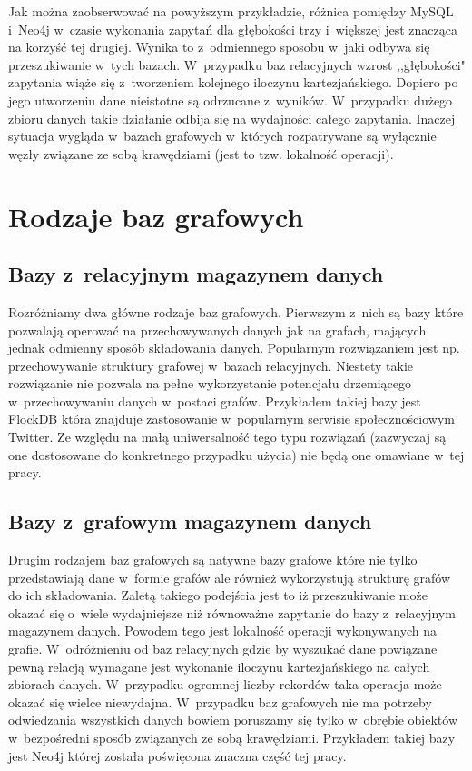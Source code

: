 \documentclass{xmgr}
\begin{document}
Jak można zaobserwować na powyższym przykładzie, różnica pomiędzy MySQL i~Neo4j w~czasie wykonania zapytań dla głębokości trzy i~większej jest znacząca na korzyść tej drugiej. Wynika to z~odmiennego sposobu w~jaki odbywa się przeszukiwanie w~tych bazach. W~przypadku baz relacyjnych wzrost ,,głębokości" zapytania wiąże się z~tworzeniem kolejnego iloczynu kartezjańskiego. Dopiero po jego utworzeniu dane nieistotne są odrzucane z~wyników. W~przypadku dużego zbioru danych takie działanie odbija się na wydajności całego zapytania. Inaczej sytuacja wygląda w~bazach grafowych w~których rozpatrywane są wyłącznie węzły związane ze sobą krawędziami (jest to tzw. lokalność operacji).

\section{Rodzaje baz grafowych}

\subsection{Bazy z~relacyjnym magazynem danych}

Rozróżniamy dwa główne rodzaje baz grafowych. Pierwszym z~nich są bazy które pozwalają operować na przechowywanych danych jak na grafach, mających jednak odmienny sposób składowania danych. Popularnym rozwiązaniem jest np. przechowywanie struktury grafowej w~bazach relacyjnych. Niestety takie rozwiązanie nie pozwala na pełne wykorzystanie potencjału drzemiącego w~przechowywaniu danych w~postaci grafów. Przykładem takiej bazy jest FlockDB\cite{flockdb} która znajduje zastosowanie w~popularnym serwisie społecznościowym Twitter. Ze względu na małą uniwersalność tego typu rozwiązań (zazwyczaj są one dostosowane do konkretnego przypadku użycia) nie będą one omawiane w~tej pracy.

\subsection{Bazy z~grafowym magazynem danych}
Drugim rodzajem baz grafowych są natywne bazy grafowe które nie tylko przedstawiają dane w~formie grafów ale również wykorzystują strukturę grafów do ich składowania. Zaletą takiego podejścia jest to iż przeszukiwanie może okazać się o~wiele wydajniejsze niż równoważne zapytanie do bazy z~relacyjnym magazynem danych. Powodem tego jest lokalność operacji wykonywanych na grafie. W~odróżnieniu od baz relacyjnych gdzie by wyszukać dane powiązane pewną relacją wymagane jest wykonanie iloczynu kartezjańskiego na całych zbiorach danych. W~przypadku ogromnej liczby rekordów taka operacja może okazać się wielce niewydajna. W~przypadku baz grafowych nie ma potrzeby odwiedzania wszystkich danych bowiem poruszamy się tylko w~obrębie obiektów w~bezpośredni sposób związanych ze sobą krawędziami. Przykładem takiej bazy jest Neo4j której została poświęcona znaczna część tej pracy.
\end{document}
